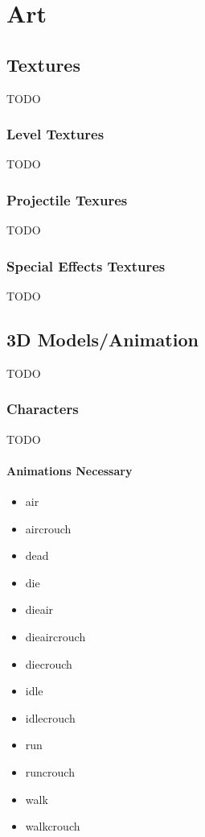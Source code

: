 \chapter{Art}

\section{Textures}

TODO

\subsection{Level Textures}

TODO

\subsection{Projectile Texures}

TODO

\subsection{Special Effects Textures}

TODO

\section{3D Models/Animation}

TODO

\subsection{Characters}

TODO

\subsubsection{Animations Necessary}

\begin{itemize}

\item air
\item aircrouch
\item dead
\item die
\item dieair
\item dieaircrouch
\item diecrouch
\item idle
\item idlecrouch
\item run
\item runcrouch
\item walk
\item walkcrouch

\end{itemize}

